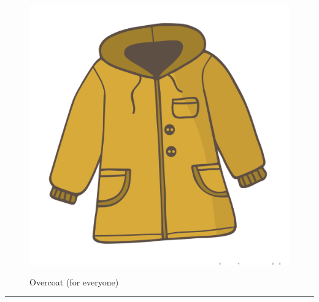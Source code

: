 \documentclass{article}
\begin{document}
    \begin{figure}[H]
        \centering
        \begin{minipage}{0.25\textwidth}
            \centering
            \includegraphics[width=\textwidth]{../SurvivalItemImages/overcoat}
        \end{minipage}\hfill
        \begin{minipage}{0.7\textwidth}
            \centering
            \Large Overcoat (for everyone)
        \end{minipage}
    \end{figure}
    \vspace{-0.8em}
    \noindent\rule{\textwidth}{0.4pt}
            
\end{document}
